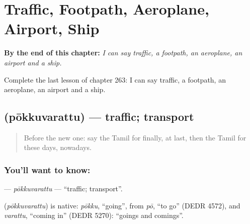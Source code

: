 
\chapter{Traffic, Footpath, Aeroplane, Airport, Ship}
\label{ch:ta-traffic-footpath-aeroplane-airport-ship}

\begin{chapteropening}
\textbf{By the end of this chapter:} \emph{I can say traffic, a footpath, an aeroplane, an airport and a ship.}

Complete the last lesson of chapter 263: I can say traffic, a footpath, an aeroplane, an airport and a ship.
\end{chapteropening}

\section[\texorpdfstring{\ta{போக்குவரத்து} (pōkkuvarattu)}{போக்குவரத்து (pōkkuvarattu)}]{ (pōkkuvarattu) — traffic; transport}

\label{lesson:TA-C263-pokkuvarattu}



\begin{quote}
Before the new one: say the Tamil for finally, at last, then the Tamil for these days, nowadays.
\end{quote}

\subsection*{You'll want to know: }
\textbf{} — \emph{pōkkuvarattu} — \textquotedblleft{}traffic; transport\textquotedblright{}.

\begin{cousinweb}
\textbf{} (\emph{pōkkuvarattu}) is native: \emph{pōkku}, \textquotedblleft{}going\textquotedblright{}, from \emph{pō}, \textquotedblleft{}to go\textquotedblright{} (DEDR 4572), and \emph{varattu}, \textquotedblleft{}coming in\textquotedblright{} (DEDR 5270): \textquotedblleft{}goings and comings\textquotedblright{}.
\end{cousinweb}

